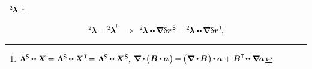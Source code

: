 \vspace{-0.5em}
~${^2\hspace{-0.2ex}\bm{\lambda}}$
\footnote{${%
\bm{\Lambda}^{\hspace{-0.16ex}\mathsf{S}} \hspace{-0.1ex} \dotdotp \hspace{-0.1ex} \bm{X} \hspace{-0.2ex} =
\hspace{.1ex} \bm{\Lambda}^{\hspace{-0.16ex}\mathsf{S}} \hspace{-0.1ex} \dotdotp \hspace{-0.1ex} \bm{X}^{\T} \hspace{-0.4ex} =
\hspace{.1ex} \bm{\Lambda}^{\hspace{-0.16ex}\mathsf{S}} \hspace{-0.1ex} \dotdotp \hspace{-0.1ex} \bm{X}^{\hspace{.1ex}\mathsf{S}}
\hspace{-0.25ex}}$,
\hspace{.66em}
${%
\boldnabla \hspace{-0.1ex} \dotp \hspace{-0.2ex} \bigl( \hspace{.1ex} {\bm{B}} \hspace{-0.1ex} \dotp \bm{a} \hspace{.16ex} \bigr)
\hspace{-0.2ex} = \hspace{-0.2ex}
\bigl( \hspace{.1ex} \boldnabla \dotp \hspace{-0.15ex} \bm{B} \hspace{.1ex} \bigr) \hspace{-0.2ex} \dotp \bm{a} \hspace{.1ex}
+ \bm{B}^{\T} \hspace{-0.3ex} \dotdotp \boldnabla \hspace{-0.15ex} \bm{a}
}$}

\nopagebreak\vspace{-0.2em}\begin{equation*}
\bivalentlagrangemultiplier = \hspace{-0.2ex} \bivalentlagrangemultiplier^{\hspace{-0.33ex}\T}
\hspace{.466em} \Rightarrow \hspace{.4em}
\hspace{.12ex}\bivalentlagrangemultiplier \dotdotp \hspace{-0.15ex} \insideinfinitesimalstrainvariation
= \bivalentlagrangemultiplier \dotdotp \hspace{-0.15ex} \boldnabla \variation{\currentlocationvector}^{\T}
\hspace{-0.4ex} ,
\end{equation*}

